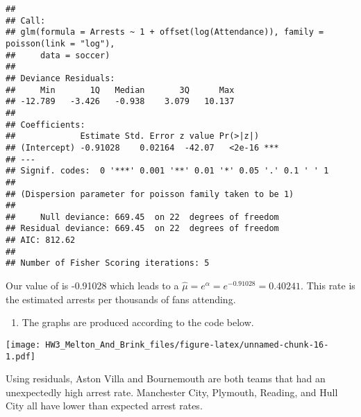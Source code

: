 \documentclass[
]{article}
\newenvironment{Shaded}{\begin{snugshade}}{\end{snugshade}}
\newcommand{\DataTypeTok}[1]{\textcolor[rgb]{0.13,0.29,0.53}{#1}}
\newcommand{\DecValTok}[1]{\textcolor[rgb]{0.00,0.00,0.81}{#1}}
\newcommand{\KeywordTok}[1]{\textcolor[rgb]{0.13,0.29,0.53}{\textbf{#1}}}
\newcommand{\NormalTok}[1]{#1}
\newcommand{\OperatorTok}[1]{\textcolor[rgb]{0.81,0.36,0.00}{\textbf{#1}}}
\newcommand{\StringTok}[1]{\textcolor[rgb]{0.31,0.60,0.02}{#1}}
\providecommand{\tightlist}{%
  \setlength{\itemsep}{0pt}\setlength{\parskip}{0pt}}
\begin{document}
\begin{verbatim}
## 
## Call:
## glm(formula = Arrests ~ 1 + offset(log(Attendance)), family = poisson(link = "log"), 
##     data = soccer)
## 
## Deviance Residuals: 
##     Min       1Q   Median       3Q      Max  
## -12.789   -3.426   -0.938    3.079   10.137  
## 
## Coefficients:
##             Estimate Std. Error z value Pr(>|z|)    
## (Intercept) -0.91028    0.02164  -42.07   <2e-16 ***
## ---
## Signif. codes:  0 '***' 0.001 '**' 0.01 '*' 0.05 '.' 0.1 ' ' 1
## 
## (Dispersion parameter for poisson family taken to be 1)
## 
##     Null deviance: 669.45  on 22  degrees of freedom
## Residual deviance: 669.45  on 22  degrees of freedom
## AIC: 812.62
## 
## Number of Fisher Scoring iterations: 5
\end{verbatim}

Our value of \alpha is -0.91028 which leads to a
\(\hat \mu = e^\alpha =e^{-0.91028}=0.40241\). This rate is the
estimated arrests per thousands of fans attending.

\begin{enumerate}
\def\labelenumi{\alph{enumi})}
\setcounter{enumi}{2}
\tightlist
\item
  The graphs are produced according to the code below.
\end{enumerate}

\begin{Shaded}
\end{Shaded}

\texttt{[image: HW3\_Melton\_And\_Brink\_files/figure-latex/unnamed-chunk-16-1.pdf]}

Using residuals, Aston Villa and Bournemouth are both teams that had an
unexpectedly high arrest rate. Manchester City, Plymouth, Reading, and
Hull City all have lower than expected arrest rates.
\end{document}
